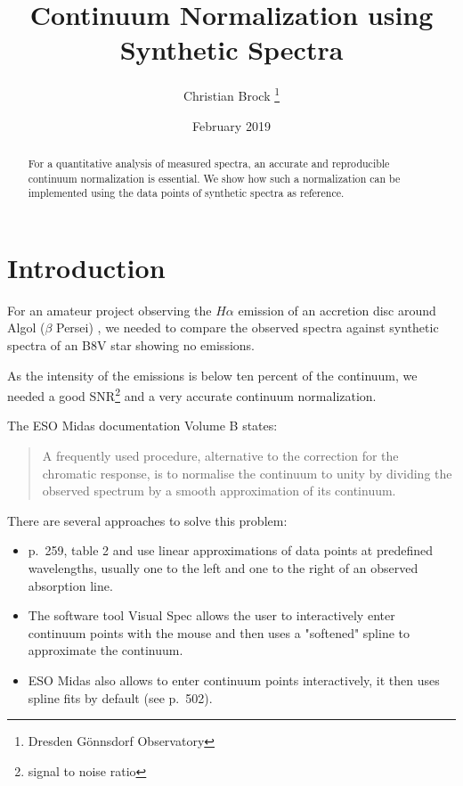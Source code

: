 \documentclass[10pt,a4paper,notitlepage,twocolumn]{article}
\title{Continuum Normalization using Synthetic Spectra}
\author{Christian Brock \footnote{Dresden Gönnsdorf Observatory}}
\date{February 2019}
\begin{document}
\setlength{\parindent}{0pt} 
\setlength{\parskip}{4pt} 

\maketitle

\begin{abstract}
	For a quantitative analysis of measured spectra, an accurate and reproducible continuum normalization is essential.
	We show how such a normalization can be implemented using the data points of synthetic spectra as reference.
\end{abstract}

\section{Introduction}

For an amateur project observing the $H\alpha$ emission of an accretion disc around Algol ($\beta$ Persei) \cite{Bitnar2017}, we needed to compare the observed spectra against synthetic spectra of an B8V star showing no emissions.

As the intensity of the emissions is below ten percent of the continuum, we needed a good SNR\footnote{signal to noise ratio} and a very accurate continuum normalization.

The ESO Midas documentation \cite{EsoMidas} Volume B states:
\begin{quote}
	A frequently used procedure, alternative to the correction for the chromatic response, is to normalise the continuum to unity by dividing the observed spectrum by a smooth approximation of its continuum.
\end{quote}

There are several approaches to solve this problem:
\begin{itemize} \itemsep -8pt
\item \cite{Richards1993} p.\ 259, table 2 and \cite{Liebisch2018} use linear approximations of data points at predefined wavelengths, usually one to the left and one to the right of an observed absorption line.
\item The software tool Visual Spec \cite{DesnouxVSpecTutorial} allows the user to interactively enter continuum points with the mouse and then uses a "softened" spline to approximate the continuum.
\item ESO Midas \cite{EsoMidas} also allows to enter continuum points interactively, it then uses spline fits by default (see \cite{SablowskiSchanne2018} p.\ 502).
\end{itemize}
\end{document}
